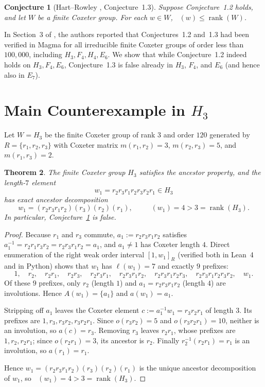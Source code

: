 \documentclass[11pt,a4paper]{article}
\newtheorem{theorem}{Theorem}
\newtheorem{conjecture}[theorem]{Conjecture}
\DeclareMathOperator{\ilen}{\ell_{\mathrm{inv}}}
\DeclareMathOperator{\rank}{rank}
\begin{document}
\begin{conjecture}[Hart--Rowley \cite{HartRowley2025}, Conjecture~1.3]\label{conj:hr}
Suppose Conjecture~1.2 holds, and let $W$ be a finite Coxeter group. For each $w \in W$, $\ilen(w) \le \rank(W)$.
\end{conjecture}

In Section~3 of \cite{HartRowley2025}, the authors reported that Conjectures~1.2 and~1.3 had been verified in Magma for all irreducible finite Coxeter groups of order less than $100{,}000$, including $H_3, F_4, H_4, E_6$. We show that while Conjecture~1.2 indeed holds on $H_3, F_4, E_6$, Conjecture~1.3 is false already in $H_3$, $F_4$, and $E_6$ (and hence also in $E_7$).

\section{Main Counterexample in $H_3$}

Let $W = H_3$ be the finite Coxeter group of rank $3$ and order $120$ generated by $R = \{r_1, r_2, r_3\}$ with Coxeter matrix $m(r_1, r_2) = 3$, $m(r_2, r_3) = 5$, and $m(r_1, r_3) = 2$.

\begin{theorem}\label{thm:h3}
The finite Coxeter group $H_3$ satisfies the ancestor property, and the length-$7$ element
\[
w_1 = r_2 r_3 r_1 r_2 r_3 r_2 r_1 \in H_3
\]
has exact ancestor decomposition
\[
w_1 = (r_2 r_3 r_1 r_2)(r_3)(r_2)(r_1), \qquad \ilen(w_1) = 4 > 3 = \rank(H_3).
\]
In particular, Conjecture~\ref{conj:hr} is false.
\end{theorem}

\begin{proof}
Because $r_1$ and $r_3$ commute, $a_1 := r_2 r_3 r_1 r_2$ satisfies $a_1^{-1} = r_2 r_1 r_3 r_2 = r_2 r_3 r_1 r_2 = a_1$, and $a_1 \neq 1$ has Coxeter length $4$. Direct enumeration of the right weak order interval $[1, w_1]_R$ (verified both in Lean~4 and in Python) shows that $w_1$ has $\ell(w_1) = 7$ and exactly $9$ prefixes:
\[
1,\quad r_2,\quad r_2 r_1,\quad r_2 r_3,\quad r_2 r_3 r_1,\quad r_2 r_3 r_1 r_2,\quad r_2 r_3 r_1 r_2 r_3,\quad r_2 r_3 r_1 r_2 r_3 r_2,\quad w_1.
\]
Of these $9$ prefixes, only $r_2$ (length $1$) and $a_1 = r_2 r_3 r_1 r_2$ (length $4$) are involutions. Hence $A(w_1) = \{a_1\}$ and $a(w_1) = a_1$.

Stripping off $a_1$ leaves the Coxeter element $c := a_1^{-1} w_1 = r_3 r_2 r_1$ of length $3$. Its prefixes are $1, r_3, r_3 r_2, r_3 r_2 r_1$. Since $o(r_3 r_2) = 5$ and $o(r_3 r_2 r_1) = 10$, neither is an involution, so $a(c) = r_3$. Removing $r_3$ leaves $r_2 r_1$, whose prefixes are $1, r_2, r_2 r_1$; since $o(r_2 r_1) = 3$, its ancestor is $r_2$. Finally $r_2^{-1}(r_2 r_1) = r_1$ is an involution, so $a(r_1) = r_1$.

Hence $w_1 = (r_2 r_3 r_1 r_2)(r_3)(r_2)(r_1)$ is the unique ancestor decomposition of $w_1$, so $\ilen(w_1) = 4 > 3 = \rank(H_3)$.
\end{proof}
\end{document}
